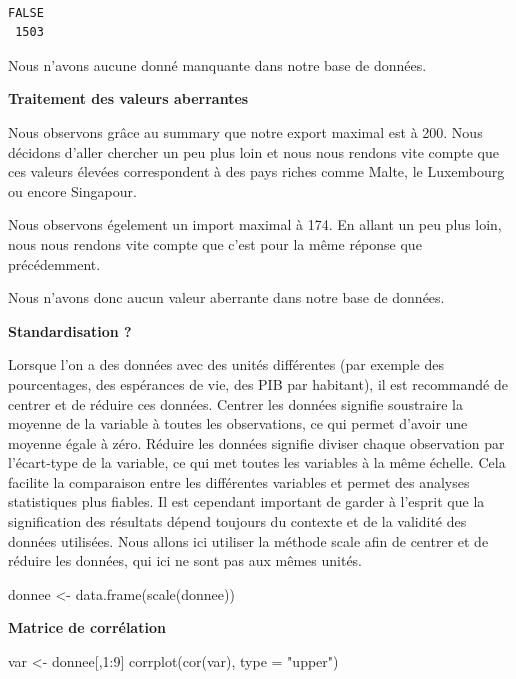 \documentclass[
]{article}
\newenvironment{Shaded}{}{}
\newcommand{\AttributeTok}[1]{#1}
\newcommand{\DecValTok}[1]{#1}
\newcommand{\FunctionTok}[1]{#1}
\newcommand{\NormalTok}[1]{#1}
\newcommand{\OtherTok}[1]{\textcolor[rgb]{1.00,0.25,0.00}{#1}}
\newcommand{\SpecialCharTok}[1]{\textcolor[rgb]{0.00,0.50,0.50}{#1}}
\newcommand{\StringTok}[1]{\textcolor[rgb]{0.00,0.50,0.50}{#1}}
\begin{document}
\begin{verbatim}

FALSE 
 1503 
\end{verbatim}

Nous n'avons aucune donné manquante dans notre base de données.

\textbf{Traitement des valeurs aberrantes}

Nous observons grâce au summary que notre export maximal est à 200. Nous
décidons d'aller chercher un peu plus loin et nous nous rendons vite
compte que ces valeurs élevées correspondent à des pays riches comme
Malte, le Luxembourg ou encore Singapour.

Nous observons égelement un import maximal à 174. En allant un peu plus
loin, nous nous rendons vite compte que c'est pour la même réponse que
précédemment.

Nous n'avons donc aucun valeur aberrante dans notre base de données.

\textbf{Standardisation ?}

Lorsque l'on a des données avec des unités différentes (par exemple des
pourcentages, des espérances de vie, des PIB par habitant), il est
recommandé de centrer et de réduire ces données. Centrer les données
signifie soustraire la moyenne de la variable à toutes les observations,
ce qui permet d'avoir une moyenne égale à zéro. Réduire les données
signifie diviser chaque observation par l'écart-type de la variable, ce
qui met toutes les variables à la même échelle. Cela facilite la
comparaison entre les différentes variables et permet des analyses
statistiques plus fiables. Il est cependant important de garder à
l'esprit que la signification des résultats dépend toujours du contexte
et de la validité des données utilisées. Nous allons ici utiliser la
méthode scale afin de centrer et de réduire les données, qui ici ne sont
pas aux mêmes unités.

\begin{Shaded}
\begin{Highlighting}[]
\NormalTok{donnee }\OtherTok{\textless{}{-}} \FunctionTok{data.frame}\NormalTok{(}\FunctionTok{scale}\NormalTok{(donnee))}
\end{Highlighting}
\end{Shaded}

\textbf{Matrice de corrélation}

\begin{Shaded}
\begin{Highlighting}[]
\NormalTok{var }\OtherTok{\textless{}{-}}\NormalTok{ donnee[,}\DecValTok{1}\SpecialCharTok{:}\DecValTok{9}\NormalTok{]}
\FunctionTok{corrplot}\NormalTok{(}\FunctionTok{cor}\NormalTok{(var), }\AttributeTok{type =} \StringTok{"upper"}\NormalTok{)}
\end{Highlighting}
\end{Shaded}
\end{document}
